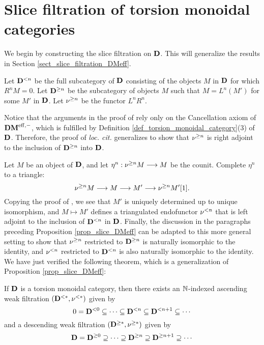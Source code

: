 \section{Slice filtration of torsion monoidal categories}
\label{sect_summary_slice_filt_on_DCat}

We begin by constructing the slice filtration on $\mathbf{D}$. This will
generalize the results in Section
\ref{sect_slice_filtration_DMeff}.

\begin{defn}\label{def_slice_filt_general}
Let $\mathbf{D}^{< n}$ be the full subcategory of $\mathbf{D}$ consisting of the objects
$M$ in $\mathbf{D}$ for which $R^n M = 0$. Let $\mathbf{D}^{\geq n}$ be 
the subcategory of objects $M$ such that $M = L^n(M')$ for some 
$M'$ in $\mathbf{D}$. Let $\nu^{\geq n}$ be the functor  $L^nR^n$.
\end{defn}

Notice that the arguments in the proof of \cite[1.1]{HuKa} rely 
only on the Cancellation axiom of $\mathbf{DM}^{\mathrm{eff},-}$, which is fulfilled by 
Definition \ref{def_torsion_monoidal_category}(3) of $\mathbf{D}$. 
Therefore, the proof of \emph{loc. cit.} generalizes to show that 
$\nu^{\geq n}$ is right adjoint to the inclusion of 
$\mathbf{D}^{\geq n}$ into $\mathbf{D}$. 

Let $M$ be an object of $\mathbf{D}$, and let $\eta^n : \nu^{\geq n} M 
\longrightarrow M$ be the counit. Complete $\eta^n$ to a triangle:
\[
\nu^{\geq n} M \longrightarrow M \longrightarrow M' \longrightarrow \nu^{\geq n} M'[1].
\]
Copying the proof of \cite[1.3]{HuKa}, we see that $M'$ is 
uniquely determined up to unique isomorphism, and $M \mapsto
M'$ defines a triangulated endofunctor $\nu^{< n}$ that is
left adjoint to the inclusion of $\mathbf{D}^{< n}$ in $\mathbf{D}$.
Finally, the discussion in the paragraphs preceding Proposition 
\ref{prop_slice_DMeff} can be adapted to this more general setting
to show that $\nu^{\geq n}$ restricted to $\mathbf{D}^{\geq n}$ is 
naturally isomorphic to the identity, and $\nu^{< n}$ restricted 
to $\mathbf{D}^{< n}$ is also naturally isomorphic to the 
identity. We have just verified the following theorem, which is a 
generalization of Proposition \ref{prop_slice_DMeff}:

\begin{thm}\label{thm_summary_triang_cat}
If $\mathbf{D}$ is a torsion monoidal category, then there exists an
$\mathbb{N}$-indexed ascending weak filtration $(\mathbf{D}^{< *},
\nu^{< *})$ given by
\[
0 = \mathbf{D}^{< 0} \subseteq \cdots \subseteq \mathbf{D}^{< n}
   \subseteq \mathbf{D}^{< n + 1} \subseteq \cdots
\]
and a descending weak filtration $(\mathbf{D}^{\geq *}, \nu^{\geq *})$
given by
\[
\mathbf{D} = \mathbf{D}^{\geq 0} \supseteq \cdots \supseteq \mathbf{D}^{\geq n}
\supseteq \mathbf{D}^{\geq n + 1} \supseteq \cdots
\]
\end{thm}

